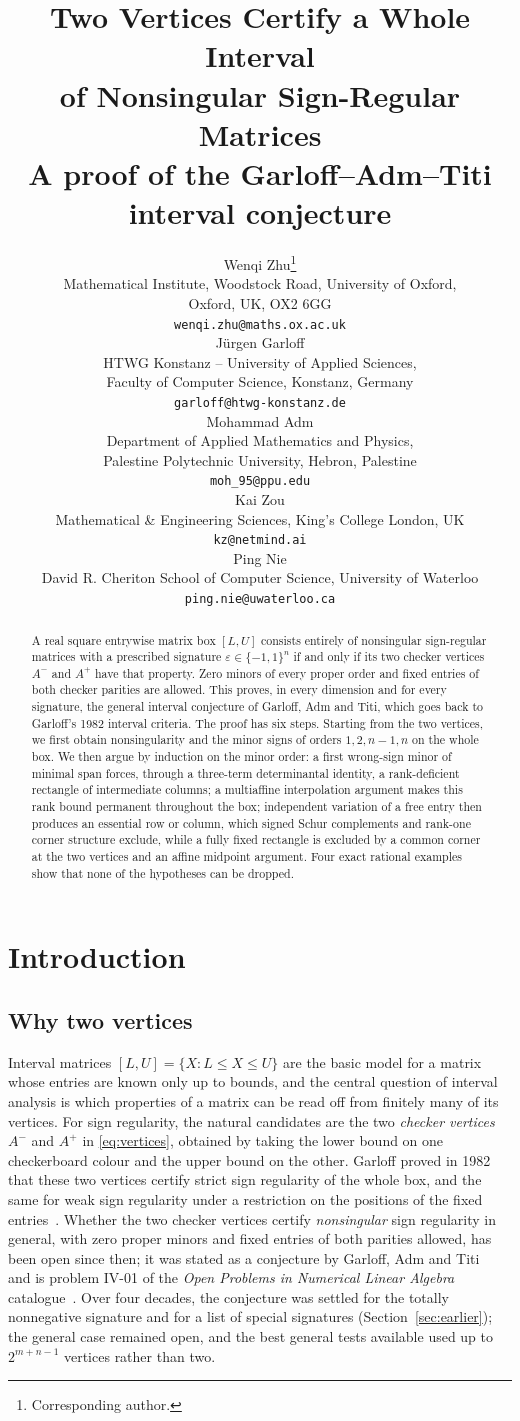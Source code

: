 \documentclass[10pt,a4paper]{article}
\title{Two Vertices Certify a Whole Interval\\ of Nonsingular Sign-Regular Matrices\\[2pt]
\large A proof of the Garloff--Adm--Titi interval conjecture}
\author{%
Wenqi Zhu\thanks{Corresponding author.}\\
{\small Mathematical Institute, Woodstock Road, University of Oxford,}\\
{\small Oxford, UK, OX2 6GG}\\
{\small\texttt{wenqi.zhu@maths.ox.ac.uk}}\\[1ex]
J\"urgen Garloff\\
{\small HTWG Konstanz -- University of Applied Sciences,}\\
{\small Faculty of Computer Science, Konstanz, Germany}\\
{\small\texttt{garloff@htwg-konstanz.de}}\\[1ex]
Mohammad Adm\\
{\small Department of Applied Mathematics and Physics,}\\
{\small Palestine Polytechnic University, Hebron, Palestine}\\
{\small\texttt{moh\_95@ppu.edu}}\\[1ex]
Kai Zou\\
{\small Mathematical \& Engineering Sciences, King's College London, UK}\\
{\small\texttt{kz@netmind.ai}}\\[1ex]
Ping Nie\\
{\small David R. Cheriton School of Computer Science, University of Waterloo}\\
{\small\texttt{ping.nie@uwaterloo.ca}}}
\date{}
\theoremstyle{definition}
\theoremstyle{remark}
\numberwithin{equation}{section}
\newcommand{\eps}{\varepsilon}
\begin{document}
\maketitle
\begin{abstract}
A real square entrywise matrix box $[L,U]$ consists entirely of
nonsingular sign-regular matrices with a prescribed signature
$\eps\in\{-1,1\}^n$ if and only if its two checker vertices $A^-$ and
$A^+$ have that property. Zero minors of every proper order and fixed
entries of both checker parities are allowed. This proves, in every
dimension and for every signature, the general interval conjecture of
Garloff, Adm and Titi, which goes back to Garloff's 1982 interval
criteria. The proof has six steps. Starting from the two vertices, we
first obtain nonsingularity and the minor signs of orders $1,2,n-1,n$
on the whole box. We then argue by induction on the minor order: a first
wrong-sign minor of minimal span forces, through a three-term
determinantal identity, a rank-deficient rectangle of intermediate
columns; a multiaffine interpolation argument makes this rank bound
permanent throughout the box; independent variation of a free entry then
produces an essential row or column, which signed Schur complements and
rank-one corner structure exclude, while a fully fixed rectangle is
excluded by a common corner at the two vertices and an affine midpoint
argument. Four exact rational examples show that none of the hypotheses
can be dropped.
\end{abstract}

\section{Introduction}\label{sec:intro}

\subsection{Why two vertices}
Interval matrices $[L,U]=\{X:L\leq X\leq U\}$ are the basic model for a
matrix whose entries are known only up to bounds, and the central question
of interval analysis is which properties of a matrix can be read off from
finitely many of its vertices. For sign regularity, the natural candidates
are the two \emph{checker vertices} $A^-$ and $A^+$ in
\eqref{eq:vertices}, obtained by taking the lower bound on one checkerboard
colour and the upper bound on the other. Garloff proved in 1982 that these
two vertices certify strict sign regularity of the whole box, and the same
for weak sign regularity under a restriction on the positions of the fixed
entries~\cite{Garloff1982}. Whether the two checker vertices certify
\emph{nonsingular} sign regularity in general, with zero proper minors and
fixed entries of both parities allowed, has been open since then; it was
stated as a conjecture by Garloff, Adm and Titi~\cite{Survey2016}
and is problem IV-01 of the \emph{Open Problems in Numerical Linear
Algebra} catalogue~\cite{IV01}. Over four decades, the conjecture was
settled for the totally nonnegative signature and for a list of special
signatures (Section~\ref{sec:earlier}); the general case remained open,
and the best general tests available used up to $2^{m+n-1}$ vertices
rather than two.
\end{document}
